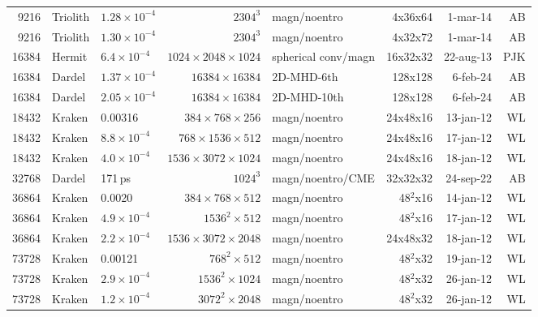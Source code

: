 \documentclass[\mydriver,12pt,twoside,notitlepage,a4paper]{article}
\newcommand{\ps}{\,{\rm ps}}
\begin{document}
\begin{center}
\begin{footnotesize}
\begin{longtable}{rllrlrrr}
9216&Triolith&$1.28{\!\times\!}10^{-4}$&$2304^3$&magn/noentro&4x36x64& 1-mar-14 & AB \\
9216&Triolith&$1.30{\!\times\!}10^{-4}$&$2304^3$&magn/noentro&4x32x72& 1-mar-14 & AB \\
16384&Hermit&$6.4{\!\times\!}10^{-4}$&$1024{\!\times\!}2048{\!\times\!}1024$&spherical conv/magn&16x32x32&22-aug-13&PJK\\
16384&Dardel&$1.37{\!\times\!}10^{-4}$&$16384{\!\times\!}16384$&2D-MHD-6th&128x128&6-feb-24&AB\\
16384&Dardel&$2.05{\!\times\!}10^{-4}$&$16384{\!\times\!}16384$&2D-MHD-10th&128x128&6-feb-24&AB\\ %
18432 & Kraken& 0.00316  &$384{\!\times\!}768{\!\times\!}256$ & magn/noentro & 24x48x16 &13-jan-12 & WL\\
18432 & Kraken&$8.8{\!\times\!}10^{-4}$  &$768{\!\times\!}1536{\!\times\!}512$ & magn/noentro & 24x48x16 &17-jan-12 & WL\\
18432 & Kraken& $4.0{\!\times\!}10^{-4}$ &$1536{\!\times\!}3072{\!\times\!}1024$ & magn/noentro & 24x48x16 &18-jan-12 & WL\\
32768 & Dardel &$ $171\ps$ $&$1024^3$ & magn/noentro/CME & 32x32x32  & 24-sep-22 & AB \\
36864 & Kraken& 0.0020  &$384{\!\times\!}768{\!\times\!}512$ & magn/noentro & 48$^2$x16 &14-jan-12 & WL\\
36864 & Kraken& $4.9{\!\times\!}10^{-4}$  &$1536^2{\!\times\!}512$ & magn/noentro & 48$^2$x16 &17-jan-12 & WL\\
36864 & Kraken& $2.2{\!\times\!}10^{-4}$  &$1536{\!\times\!}3072{\!\times\!}2048$ & magn/noentro & 24x48x32 &18-jan-12 & WL\\
73728 & Kraken& 0.00121  &$768^2{\!\times\!}512$ & magn/noentro & 48$^2$x32 &19-jan-12 & WL\\
73728 & Kraken& $2.9{\!\times\!}10^{-4}$ &$1536^2{\!\times\!}1024$ & magn/noentro & 48$^2$x32 &26-jan-12 & WL\\
73728 & Kraken& $1.2{\!\times\!}10^{-4}$  &$3072^2{\!\times\!}2048$ & magn/noentro & 48$^2$x32 &26-jan-12 & WL\\
\bottomrule
  \end{longtable}
    \end{footnotesize}
  \end{center}
\normalsize
\end{document}
